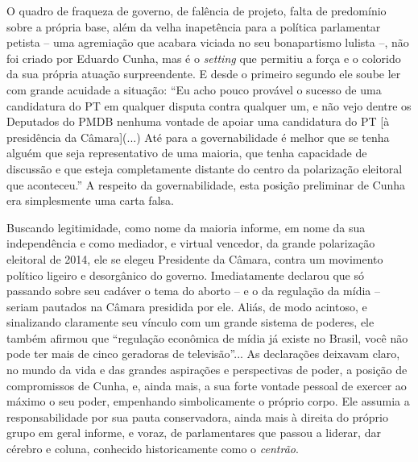 O quadro de fraqueza de governo, de falência de projeto, falta de
predomínio sobre a própria base, além da velha inapetência para a
política parlamentar petista -- uma agremiação que acabara viciada no
seu bonapartismo lulista --, não foi criado por Eduardo Cunha, mas é o
\emph{setting} que permitiu a força e o colorido da sua própria atuação
surpreendente. E desde o primeiro segundo ele soube ler com grande
acuidade a situação: ``Eu acho pouco provável o sucesso de uma
candidatura do PT em qualquer disputa contra qualquer um, e não vejo
dentre os Deputados do PMDB nenhuma vontade de apoiar uma candidatura do
PT {[}à presidência da Câmara{]}(...) Até para a governabilidade é
melhor que se tenha alguém que seja representativo de uma maioria, que
tenha capacidade de discussão e que esteja completamente distante do
centro da polarização eleitoral que aconteceu.'' A respeito da
governabilidade, esta posição preliminar de Cunha era simplesmente uma
carta falsa.

Buscando legitimidade, como nome da maioria informe, em nome da sua
independência e como mediador, e virtual vencedor, da grande polarização
eleitoral de 2014, ele se elegeu Presidente da Câmara, contra um
movimento político ligeiro e desorgânico do governo. Imediatamente
declarou que só passando sobre seu cadáver o tema do aborto -- e o da
regulação da mídia -- seriam pautados na Câmara presidida por ele.
Aliás, de modo acintoso, e sinalizando claramente seu vínculo com um
grande sistema de poderes, ele também afirmou que ``regulação econômica
de mídia já existe no Brasil, você não pode ter mais de cinco geradoras
de televisão''... As declarações deixavam claro, no mundo da vida e das
grandes aspirações e perspectivas de poder, a posição de compromissos de
Cunha, e, ainda mais, a sua forte vontade pessoal de exercer ao máximo o
seu poder, empenhando simbolicamente o próprio corpo. Ele assumia a
responsabilidade por sua pauta conservadora, ainda mais à direita do
próprio grupo em geral informe, e voraz, de parlamentares que passou a
liderar, dar cérebro e coluna, conhecido historicamente como o
\emph{centrão}.

